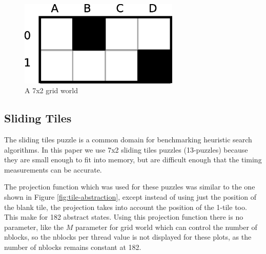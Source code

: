 \documentclass{article}
\begin{document}
\begin{figure}[t]
\begin{center}
\includegraphics[width=3in]{images/grid-world-small.eps}
\caption{A 7x2 grid world}
\label{fig:small-grid}
\end{center}
\end{figure}

\subsection{Sliding Tiles}

The sliding tiles puzzle is a common domain for benchmarking heuristic
search algorithms.  In this paper we use 7x2 sliding tiles puzzles
(13-puzzles) because they are small enough to fit into memory, but are
difficult enough that the timing measurements can be accurate.

The projection function which was used for these puzzles was similar
to the one shown in Figure \ref{fig:tile-abstraction}, except instead
of using just the position of the blank tile, the projection takes
into account the position of the 1-tile too.  This make for 182
abstract states.  Using this projection function there is no
parameter, like the $M$ parameter for grid world which can control the
number of nblocks, so the nblocks per thread value is not displayed
for these plots, as the number of nblocks remains constant at 182.
\end{document}
